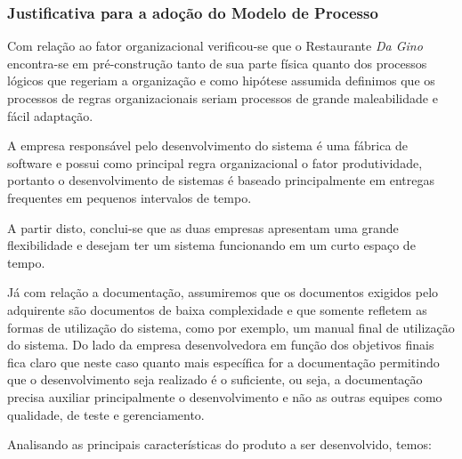 \subsubsection{Justificativa para a adoção do Modelo de Processo}

Com relação ao fator organizacional verificou-se que o Restaurante \textit{Da Gino} encontra-se em pré-construção tanto de sua parte física quanto dos processos lógicos que regeriam a organização e como hipótese assumida definimos que os processos de regras organizacionais seriam processos de grande maleabilidade e fácil adaptação. 

A empresa responsável pelo desenvolvimento do sistema é uma fábrica de software e possui como principal regra organizacional o fator produtividade, portanto o desenvolvimento de sistemas é baseado principalmente em entregas frequentes em pequenos intervalos de tempo. 

A partir disto, conclui-se que as duas empresas apresentam uma grande flexibilidade e desejam ter um sistema funcionando em um curto espaço de tempo. 

Já com relação a documentação, assumiremos que os documentos exigidos pelo adquirente são documentos de baixa complexidade e que somente refletem as formas de utilização do sistema, como por exemplo, um manual final de utilização do sistema. Do lado da empresa desenvolvedora em função dos objetivos  finais fica claro que neste caso quanto mais específica for a documentação permitindo que o desenvolvimento seja realizado é o suficiente, ou seja, a documentação precisa auxiliar principalmente o desenvolvimento e não as outras equipes como qualidade, de teste e gerenciamento.

Analisando as principais características do produto a ser desenvolvido, temos:

